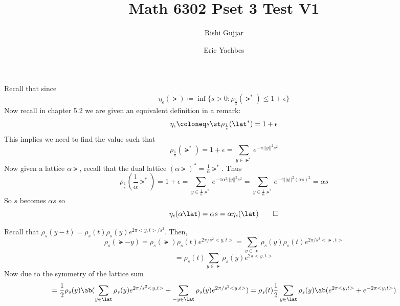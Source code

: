 \documentclass[12pt]{amsart}
\title{Math 6302 Pset 3 Test V1}
\author{Rishi Gujjar}
\author{Eric Yachbes}
\begin{document}
  \maketitle
  \begin{problem}
    \begin{subproblem}

Recall that since 
      \[\eta_\epsilon(\lat)\coloneq \inf\{s>0 : \rho_{\frac1s}(\lat^*) \leq 1+\epsilon\}\]
      Now recall in chapter 5.2 we are given an equivalent definition in a remark: 
      \[\eta_\epsilon \coloneq s\st \rho_{\frac1s}(\lat^*) = 1+\epsilon\]
      This implies we need to find the value such that 
      \[\rho_{\frac1s}(\lat^*)=1+\epsilon=\sum_{y\in\lat^*}e^{-\pi||y||^2 s^2} \]
      Now given a lattice $\alpha\lat$, recall that the dual lattice $(\alpha\lat)^* = \frac1\alpha \lat^*$. Thus
      \[\rho_{\frac1s}(\frac1\alpha\lat^*)=1+\epsilon=\sum_{y\in\frac1\alpha\lat^*}e^{-\pi\alpha^2||y||^2 s^2}= \sum_{y\in\frac1\alpha\lat^*}e^{-\pi||y||^2 (\alpha s)^2} = \alpha s\]
    So $s$ becomes $\alpha s$ so \[\eta_\epsilon (\alpha \lat) = \alpha s = \alpha \eta_\epsilon(\lat)\qed\]
      
    \end{subproblem}
    \begin{subproblem}
      Recall that $\rho_s(y-t)=\rho_s(t)\rho_s(y)e^{2\pi <y,t>/s^2}$. Then, 
      \[\rho_s(\lat-y) =  \rho_s(\lat)\rho_s(t)e^{2\pi /s^2 <y,t>}=\sum_{y\in\lat}\rho_s(y)\rho_s(t)e^{2\pi /s^2 <\lat,t>}\]
      \[= \rho_s(t)\sum_{y\in\lat}\rho_s(y)e^{2\pi <y,t>} \]
      Now due to the symmetry of the lattice sum
      \[= \frac12 \rho_s(y)\ab(\sum_{y\in\lat}\rho_s(y)e^{2\pi /s^2 <y,t>}+\sum_{-y\in\lat}\rho_s(y)e^{2\pi /s^2 <y,t>}) = \rho_s(t)\frac12\sum_{y\in\lat}\rho_s(y)\ab(e^{2\pi <y,t>}+e^{-2\pi <y,t>})\]


\end{subproblem}
\end{problem}
\end{document}
